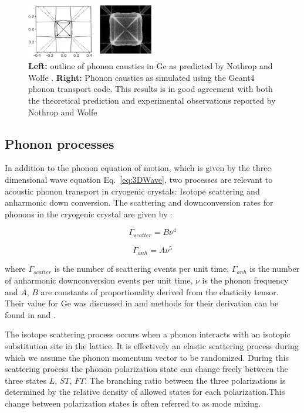 \documentclass[final,3p,times,twocolumn]{elsarticle}
\begin{document}
\begin{figure}
	\centering
		\includegraphics[width=0.5\textwidth]{caustics.png}
	\caption{\textbf{Left:} outline of phonon caustics in Ge as predicted by Nothrop and Wolfe \cite{Nothrop}. \textbf{Right:} Phonon caustics as simulated using the Geant4 phonon transport code. This results is in good agreement with both the theoretical prediction and experimental observations reported by Nothrop and Wolfe \cite{Nothrop} }
	\label{fig:caustics}
\end{figure}

\subsection{Phonon processes}
\label{sec:Processes}

In addition to the phonon equation of motion, which is given by the three dimensional wave equation Eq.~\ref{eq:3DWave}, two processes are relevant to acoustic phonon transport in cryogenic crystals: Isotope scattering and anharmonic down conversion\cite{Tamura1}\cite{Tamura2}\cite{Tamura3}. The scattering and downconversion rates for phonons in the cryogenic crystal are given by \cite{Tamura2}:

\begin{equation}
\label{eq:ScatterRate}
\Gamma_{scatter} = B\nu^4
\end{equation}

\begin{equation}
\label{eq:anhRate}
\Gamma_{anh} = A\nu^5
\end{equation}

where $\Gamma_{scatter}$ is the number of scattering events per unit time, $\Gamma_{anh}$ is the number of anharmonic downconversion events per unit time, $\nu$ is the phonon frequency and $A$, $B$ are constants of proportionality derived from the elasticity tensor. Their value for Ge was discussed in \cite{Brandt} and methods for their derivation can be found in \cite{Tamura1} and \cite{Tamura2}.

The isotope scattering process occurs when a phonon interacts with an isotopic substitution site in the lattice. It is effectively an elastic scattering process during which we assume the phonon momentum vector to be randomized. During this scattering process the phonon polarization state can change freely between the three states $L$, $ST$, $FT$. The branching ratio between the three polarizations is determined by the relative density of allowed states for each polarization.This change between polarization states is often referred to as mode mixing.
\end{document}
